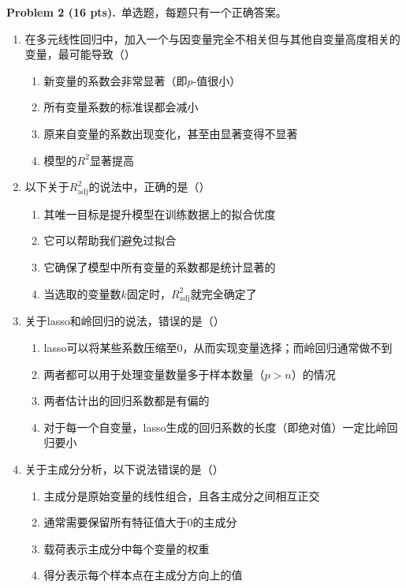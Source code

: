 \documentclass[UTF8,a4paper,11pt,fontset=fandol]{ctexart}
\newenvironment{choices}{\begin{enumerate}[label=(\Alph*),leftmargin=2.3em,itemsep=1pt,topsep=3pt]}{\end{enumerate}}
\newcommand{\blank}{\mbox{（\hspace{1.5em}）}}
\newcommand{\problem}[2]{\par\addvspace{10pt}\Needspace{5\baselineskip}\textbf{Problem #1 (#2 pts).}\ }
\begin{document}
\problem{2}{16}单选题，每题只有一个正确答案。
\begin{enumerate}[itemsep=10pt]
  \item 在多元线性回归中，加入一个与因变量完全不相关但与其他自变量高度相关的变量，最可能导致\blank
  \begin{choices}
    \item 新变量的系数会非常显著（即$p$-值很小）
    \item 所有变量系数的标准误都会减小
    \item 原来自变量的系数出现变化，甚至由显著变得不显著
    \item 模型的$R^2$显著提高
  \end{choices}
  \item 以下关于$R_{\mathrm{adj}}^2$的说法中，正确的是\blank
  \begin{choices}
    \item 其唯一目标是提升模型在训练数据上的拟合优度
    \item 它可以帮助我们避免过拟合
    \item 它确保了模型中所有变量的系数都是统计显著的
    \item 当选取的变量数$k$固定时，$R_{\mathrm{adj}}^2$就完全确定了
  \end{choices}
  \item 关于lasso和岭回归的说法，错误的是\blank
  \begin{choices}
    \item lasso可以将某些系数压缩至0，从而实现变量选择；而岭回归通常做不到
    \item 两者都可以用于处理变量数量多于样本数量（$p>n$）的情况
    \item 两者估计出的回归系数都是有偏的
    \item 对于每一个自变量，lasso生成的回归系数的长度（即绝对值）一定比岭回归要小
  \end{choices}
  \item 关于主成分分析，以下说法错误的是\blank
  \begin{choices}
    \item 主成分是原始变量的线性组合，且各主成分之间相互正交
    \item 通常需要保留所有特征值大于0的主成分
    \item 载荷表示主成分中每个变量的权重
    \item 得分表示每个样本点在主成分方向上的值
  \end{choices}
\end{enumerate}
\end{document}
